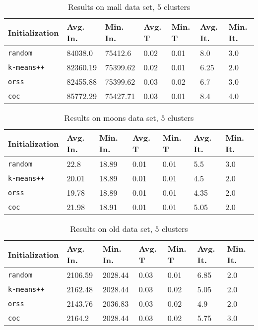 \documentclass[twoside, 11pt]{article}
\begin{document}
		\begin{table}[p]
			\begin{center}
				\begin{tabular}{|l|l|l|l|l|l|l|}
					\hline
					Initialization & Avg. In. & Min. In. & Avg. T & Min. T & Avg. It. & Min. It.\\\hline
					\texttt{random} & 84038.0 & 75412.6 & 0.02 & 0.01 & 8.0 & 3.0\\\hline
					\texttt{k-means++} & 82360.19 & 75399.62 & 0.02 & 0.01 & 6.25 & 2.0\\\hline
					\texttt{orss} & 82455.88 & 75399.62 & 0.03 & 0.02 & 6.7 & 3.0\\\hline
					\texttt{coc} & 85772.29 & 75427.71 & 0.03 & 0.01 & 8.4 & 4.0\\\hline
				\end{tabular}
				\caption{Results on mall data set, 5 clusters}
				\label{tbl:mall5}
			\end{center}
		\end{table}
		
		\begin{table}[p]
			\begin{center}
				\begin{tabular}{|l|l|l|l|l|l|l|}
					\hline
					Initialization & Avg. In. & Min. In. & Avg. T & Min. T & Avg. It. & Min. It.\\\hline
					\texttt{random} & 22.8 & 18.89 & 0.01 & 0.01 & 5.5 & 3.0\\\hline
					\texttt{k-means++} & 20.01 & 18.89 & 0.01 & 0.01 & 4.5 & 2.0\\\hline
					\texttt{orss} & 19.78 & 18.89 & 0.01 & 0.01 & 4.35 & 2.0\\\hline
					\texttt{coc} & 21.98 & 18.91 & 0.01 & 0.01 & 5.05 & 2.0\\\hline
				\end{tabular}
				\caption{Results on moons data set, 5 clusters}
				\label{tbl:moons5}
			\end{center}
		\end{table}
		
		\begin{table}[p]
			\begin{center}
				\begin{tabular}{|l|l|l|l|l|l|l|}
					\hline
					Initialization & Avg. In. & Min. In. & Avg. T & Min. T & Avg. It. & Min. It.\\\hline
					\texttt{random} & 2106.59 & 2028.44 & 0.03 & 0.01 & 6.85 & 2.0\\\hline
					\texttt{k-means++} & 2162.48 & 2028.44 & 0.03 & 0.02 & 5.05 & 2.0\\\hline
					\texttt{orss} & 2143.76 & 2036.83 & 0.03 & 0.02 & 4.9 & 2.0\\\hline
					\texttt{coc} & 2164.2 & 2028.44 & 0.03 & 0.02 & 5.75 & 3.0\\\hline
				\end{tabular}
				\caption{Results on old data set, 5 clusters}
				\label{tbl:old5}
			\end{center}
		\end{table}
		
\end{document}
